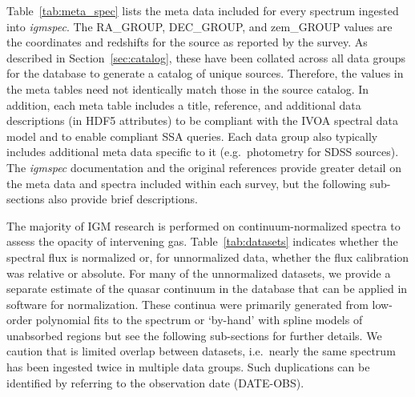\documentclass[12pt]{elsarticle}
\begin{document}
Table~\ref{tab:meta_spec} lists the meta data included
for every spectrum ingested into {\it igmspec}.
The RA\_GROUP, DEC\_GROUP, and zem\_GROUP values are the
coordinates and redshifts for the source as reported by
the survey.  As described in Section~\ref{sec:catalog},
these have been collated across all data groups for the
database to generate a catalog of unique sources.
Therefore, the values in the meta tables need not 
identically match those in the source catalog.
In addition, each meta table includes a title, reference,
and additional data descriptions (in HDF5 attributes)
to be compliant with the IVOA spectral data model
and to enable compliant SSA queries.
Each data group also typically includes additional meta data
specific to it (e.g.\ photometry for SDSS sources).
The {\it igmspec} documentation and 
the original references provide greater detail on the meta data
and spectra included within each survey, but the following
sub-sections also provide brief descriptions. 

The majority of IGM research is performed on continuum-normalized
spectra to assess the opacity of intervening gas.
Table~\ref{tab:datasets} indicates whether the spectral flux
is normalized or, for unnormalized data, whether the flux calibration
was relative or absolute.  For many of the unnormalized
datasets, we provide a separate estimate of the 
quasar continuum in the database that can be applied in
software for normalization.
These continua were primarily generated from low-order
polynomial fits to the spectrum or `by-hand' with spline models
of unabsorbed regions but
see the following sub-sections for further details.
We caution that is limited overlap between
datasets, i.e.\ nearly the same spectrum has been
ingested twice in multiple data groups.  Such
duplications can be identified by
referring to the observation date (DATE-OBS). 


\end{document}
